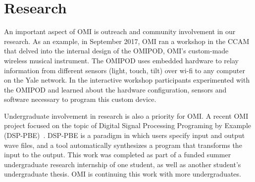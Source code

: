 \section{Research}

An important aspect of OMI is outreach and community involvement in our research. As an example, in September 2017, OMI ran a workshop in the CCAM that delved into the internal design of the OMIPOD, OMI's custom-made wireless musical instrument. The OMIPOD uses embedded hardware to relay information from different sensors (light, touch, tilt) over wi-fi to any computer on the Yale network.  In the interactive workshop participants experimented with the OMIPOD and learned about the hardware configuration, sensors and software necessary to program this custom device.

Undergraduate involvement in research is also a priority for OMI. A recent OMI project focused on the topic of Digital Signal Processing Programing by Example (DSP-PBE)~\cite{SantolucitoFARM}. DSP-PBE is a paradigm in which users specify input and output wave files, and a tool automatically synthesizes a program that transforms the input to the output. This work was completed as part of a funded summer undergraduate research internship of one student, as well as another student's undergraduate thesis. OMI is continuing this work with more undergraduates.

